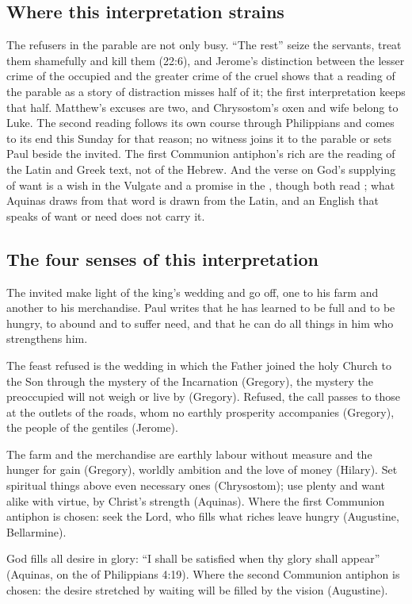 \subsection{Where this interpretation strains}

The refusers in the parable are not only busy. ``The rest'' seize the
servants, treat them shamefully and kill them (22:6), and Jerome's distinction
between the lesser crime of the occupied and the greater crime of the cruel
shows that a reading of the parable as a story of distraction misses half of
it; the first interpretation keeps that half. Matthew's excuses are two, and
Chrysostom's oxen and wife belong to Luke. The second reading follows its own
course through Philippians and comes to its end this Sunday for that reason;
no witness joins it to the parable or sets Paul beside the invited. The first Communion antiphon's rich are the reading
of the Latin and Greek text, not of the Hebrew. And the verse on God's
supplying of want is a wish in the Vulgate and a promise in the , though both read ; what Aquinas draws from that
word is drawn from the Latin, and an English that speaks of want or need
does not carry it.

\subsection{The four senses of this interpretation}

\begin{fourSenses}
\item[Literal.] The invited make light of the king's wedding and go off, one to
his farm and another to his merchandise. Paul writes that he has learned to be
full and to be hungry, to abound and to suffer need, and that he can do all
things in him who strengthens him.

\item[Allegorical.] The feast refused is the wedding in which the Father joined
the holy Church to the Son through the mystery of the Incarnation (Gregory),
the mystery the preoccupied will not weigh or live by (Gregory). Refused, the
call passes to those at the outlets of the roads, whom no earthly prosperity
accompanies (Gregory), the people of the gentiles (Jerome).

\item[Moral.] The farm and the merchandise are earthly labour without measure
and the hunger for gain (Gregory), worldly ambition and the love of money
(Hilary). Set spiritual things above even necessary ones (Chrysostom); use
plenty and want alike with virtue, by Christ's strength (Aquinas). Where the
first Communion antiphon is chosen: seek the Lord, who fills what riches leave
hungry (Augustine, Bellarmine).

\item[Anagogical.] God fills all desire in glory: ``I shall be satisfied when
thy glory shall appear'' (Aquinas, on the  of
Philippians 4:19). Where the second Communion antiphon is chosen: the desire stretched
by waiting will be filled by the vision (Augustine).
\end{fourSenses}
